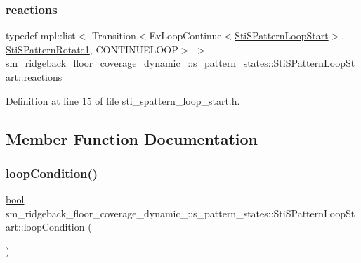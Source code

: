 \subsubsection{\texorpdfstring{reactions}{reactions}}
{\footnotesize\ttfamily typedef mpl\+::list$<$ Transition$<$Ev\+Loop\+Continue$<$\hyperlink{structsm__ridgeback__floor__coverage__dynamic__1_1_1s__pattern__states_1_1StiSPatternLoopStart}{Sti\+S\+Pattern\+Loop\+Start}$>$, \hyperlink{structsm__ridgeback__floor__coverage__dynamic__1_1_1s__pattern__states_1_1StiSPatternRotate1}{Sti\+S\+Pattern\+Rotate1}, C\+O\+N\+T\+I\+N\+U\+E\+L\+O\+OP$>$ $>$ \hyperlink{structsm__ridgeback__floor__coverage__dynamic__1_1_1s__pattern__states_1_1StiSPatternLoopStart_ab5c8d1560c9b58c3aadb5465d370fb4e}{sm\+\_\+ridgeback\+\_\+floor\+\_\+coverage\+\_\+dynamic\+\_\+::s\+\_\+pattern\+\_\+states\+::\+Sti\+S\+Pattern\+Loop\+Start\+::reactions}}



Definition at line 15 of file sti\+\_\+spattern\+\_\+loop\+\_\+start.\+h.



\subsection{Member Function Documentation}
\mbox{\label{structsm__ridgeback__floor__coverage__dynamic__1_1_1s__pattern__states_1_1StiSPatternLoopStart_a5833f41a367d2e4e346c17e92530d0b1}} 
\subsubsection{\texorpdfstring{loop\+Condition()}{loopCondition()}}
{\footnotesize\ttfamily \hyperlink{classbool}{bool} sm\+\_\+ridgeback\+\_\+floor\+\_\+coverage\+\_\+dynamic\+\_\+::s\+\_\+pattern\+\_\+states\+::\+Sti\+S\+Pattern\+Loop\+Start\+::loop\+Condition (\begin{DoxyParamCaption}{ }\end{DoxyParamCaption})\hspace{0.3cm}{\ttfamily [inline]}}




